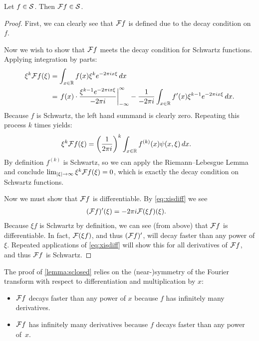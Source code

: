       \begin{lemma}
        \label{lemma:sclosed}
        Let $f\in\S$.
        Then $\F f\in\S$.
        \begin{proof}
          First, we can clearly see that $\F f$ is defined due to the decay condition on $f$.

          Now we wish to show that $\F f$ meets the decay condition for Schwartz functions.
          Applying integration by parts:
          \begin{align*}
            \xi^k\F f(\xi) &= \int_{x\in\R} f(x)\xi^ke^{-2\pi ix\xi}\,dx\\
            &= \left.f(x)\cdot\frac{\xi^{k-1}e^{-2\pi i x\xi}}{-2\pi i}\right|_{-\infty}^\infty - \frac{1}{-2\pi i}\int_{x\in\R} f'(x)\xi^{k-1}e^{-2\pi ix\xi}\,dx \text{.}
          \end{align*}
          Because $f$ is Schwartz, the left hand summand is clearly zero.
          Repeating this process $k$ times yields:
          \begin{align*}
            \xi^k\F f(\xi) &= \left(\frac{1}{2\pi i}\right)^k \int_{x\in\R}f^{(k)}(x)\psi(x,\xi)\,dx \text{.}
          \end{align*}
          By definition $f^{(k)}$ is Schwartz, so we can apply the Riemann--Lebesgue Lemma and conclude $\lim_{|\xi|\rightarrow\infty} \xi^k\F f(\xi) = 0$, which is exactly the decay condition on Schwartz functions.

          Now we must show that $\F f$ is differentiable. 
          By \cref{eq:xisdiff} we see
          \begin{align*}
            (\F f)'(\xi) &= -2\pi i \F(\xi f)(\xi) \text{.}
          \end{align*}
          Because $\xi f$ is Schwartz by definition, we can see (from above) that $\F f$ is differentiable.
          In fact, $\F(\xi f)$, and thus $(\F f)'$, will decay faster than any power of $\xi$.
          Repeated applications of \cref{eq:xisdiff} will show this for all derivatives of $\F f$, and thus $\F f$ is Schwartz.
        \end{proof}
      \end{lemma}
      \begin{rmk}
        The proof of \cref{lemma:sclosed} relies on the (near-)symmetry of the Fourier transform with respect to differentiation and multiplication by $x$:
        \begin{itemize}
          \item $\F f$ decays faster than any power of $x$ because $f$ has infinitely many derivatives.
          \item $\F f$ has infinitely many derivatives because $f$ decays faster than any power of~$x$.
        \end{itemize}
      \end{rmk}


